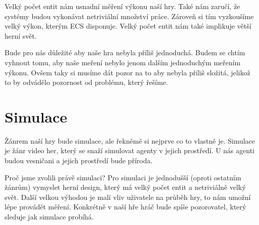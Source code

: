 Velký počet entit nám usnadní měření výkonu naší hry. Také nám zaručí, že systémy budou vykonávat netriviální množství práce. Zároveň si tím vyzkoušíme velký výkon, kterým ECS disponuje. Velký počet entit nám také implikuje větší herní svět.

Bude pro nás důležité aby naše hra nebyla příliš jednoduchá. Budem se chtím vyhnout tomu, aby naše meření nebylo jenom dalším jednoduchým meřením výkonu. Ovšem taky si musíme dát pozor na to aby nebyla příliš složitá, jelikož to by odvádělo pozornost od problému, který řešíme.


\section{Simulace}
Žánrem naší hry bude simulace, ale řekněmě si nejprve co to vlastně je. Simulace je žánr video her, který se snaží simulovat agenty v jejich prostředí. U nás agenti budou vesničani a jejich prostředí bude příroda.

Proč jsme zvolili právě simulaci? Pro simulaci je jednodušší (oproti ostatním žánrům) vymyslet herní design, který má velký počet entit a netriviálně velký svět. Další velkou výhodou je malí vliv uživatele na průběh hry, to nám umožní lépe provádět měření. Konkrétně v naší hře hráč bude spíše pozorovatel, který sleduje jak simulace probíhá.

